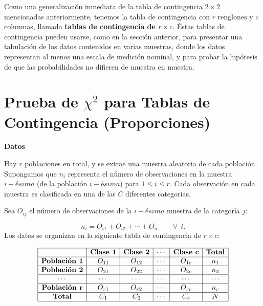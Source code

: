 \documentclass[
  a4paper,
  oneside,
  openany]{book}
\begin{document}
Como una generalización inmediata de la tabla de contingencia \(2 \times 2\) mencionadas anteriormente, tenemos la tabla de contingencia con \(r\) renglones y \(c\) columnas, llamada \textbf{tablas de contingencia de \(r \times c\)}.
Éstas tablas de contingencia pueden usarse, como en la sección anterior, para presentar una tabulación de los datos contenidos en varias muestras, donde los datos representan al menos una escala de medición nominal, y para probar la hipótesis de que las probabilidades no difieren de muestra en muestra.

\hypertarget{prueba-de-chi2-para-tablas-de-contingencia-proporciones}{%
\section{\texorpdfstring{Prueba de \(\chi^2\) para Tablas de Contingencia (Proporciones)}{Prueba de \textbackslash chi\^{}2 para Tablas de Contingencia (Proporciones)}}\label{prueba-de-chi2-para-tablas-de-contingencia-proporciones}}

\textbf{Datos}

Hay \(r\) poblaciones en total, y se extrae una muestra aleatoria de cada población. Supongamos que \(n_{i}\) representa el número de observaciones en la muestra \(i-ésima\) (de la población \(i-ésima\)) para \(1 \leq i \leq r\). Cada observación en cada muestra es clasificada en una de las \(C\) diferentes categorias.

Sea \(O_{ij}\) el número de observaciones de la \(i-ésima\) muestra de la categoría \(j\):

\[n_{i}= O_{i1}+O_{i2}+\cdots+O_{ic}\ \ \ \ \ \ \ \ \   \forall \ \ i.\]
Los datos se organizan en la siguiente tabla de contingencia de \(r \times c\):

\[
\begin{array}{|c|c|c|c|c|c|}
\hline
 & \textbf{Clase 1}  & \textbf{Clase 2}    & \cdots & \textbf{Clase c} &\textbf{Total}     \\
\hline
\textbf{Población 1} & O_{11} & O_{12} & \cdots & O_{1c} & n_{1}   \\
\hline
\textbf{Población 2} & O_{21} & O_{22} & \cdots & O_{2c} & n_{2}\\
\hline
\cdots    & \cdots & \cdots & \cdots & \cdots & \cdots\\
\hline
\textbf{Población r} &O_{r1} & O_{r2} & \cdots & O_{rc} & n_{r}\\
\hline
\textbf{Total}       & C_{1}  & C_{2}  & \cdots & C_{c}  & N \\
\hline
\end{array}
\]
\end{document}
